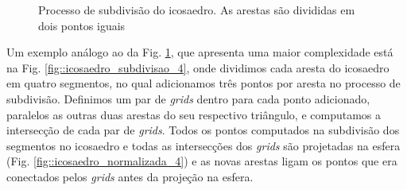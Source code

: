 \documentclass[
    12pt,                %
    oneside,            %
    a4paper,            %
    english,            %
    french,                %
    spanish,            %
    brazil                %
    ]{abntex2}
\begin{document}
\begin{figure}[ht]
\centering
\captionsetup[subfloat]{farskip=0pt,nearskip=0pt}
\centering
    \hspace{1em}
     \caption{Processo de subdivisão do icosaedro. As arestas são divididas em dois pontos iguais}
    \label{fig::icosaedro_subdivisao}
\end{figure}

Um exemplo análogo ao da Fig. \ref{fig::icosaedro_subdivisao}, que apresenta uma maior complexidade está na Fig. \ref{fig::icosaedro_subdivisao_4}, onde dividimos cada aresta do icosaedro em quatro segmentos, no qual adicionamos três pontos por aresta no processo de subdivisão. Definimos um par de \textit{grids} dentro para cada ponto adicionado, paralelos as outras duas arestas do seu respectivo triângulo, e computamos a intersecção de cada par de \textit{grids}. Todos os pontos computados na subdivisão dos segmentos no icosaedro e todas as intersecções dos \textit{grids} são projetadas na esfera (Fig. \ref{fig::icosaedro_normalizada_4}) e as novas arestas ligam os pontos que era conectados pelos \textit{grids} antes da projeção na esfera.
\end{document}
